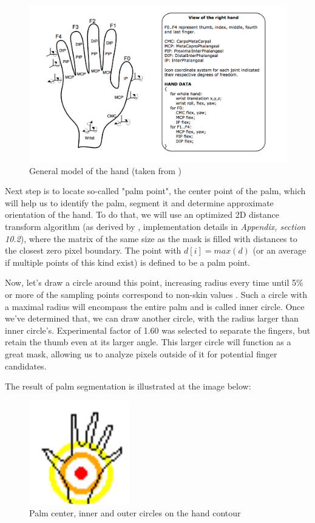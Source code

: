 \documentclass[a4paper,11pt,oneside]{article}
\begin{document}
\begin{figure}[H]
\centering
\includegraphics[scale=0.47]{hand-dof.png}
\caption{General model of the hand (taken from \cite{OT01})}
\end{figure}

Next step is to locate so-called "palm point", the center point of the palm, which will help us to identify the palm, segment it and determine approximate orientation of the hand. To do that, we will use an optimized 2D distance transform algorithm (as derived by \cite{DT01}, implementation details in \textit{Appendix, section 10.2}), where the matrix of the same size as the mask is filled with distances to the closest zero pixel boundary. The point with $d[i] = max(d)$ (or an average if multiple points of this kind exist) is defined to be a palm point.

Now, let's draw a circle around this point, increasing radius every time until 5\% or more of the sampling points correspond to non-skin values . Such a circle with a maximal radius will encompass the entire palm and is called inner circle. Once we've determined that, we can draw another circle, with the radius larger than inner circle's. Experimental factor of 1.60 was selected to separate the fingers, but retain the thumb even at its larger angle. This larger circle will function as a great mask, allowing us to analyze pixels outside of it for potential finger candidates.

The result of palm segmentation is illustrated at the image below:\\

\begin{figure}[H]
\centering
\includegraphics[scale=1.5]{hand-circles.png}
\caption{Palm center, inner and outer circles on the hand contour}
\end{figure}
\end{document}
